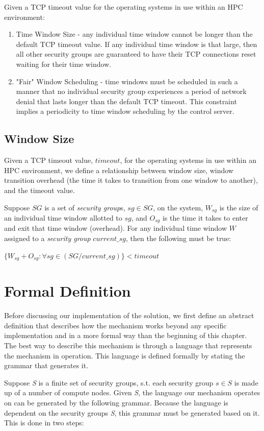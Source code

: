 \documentclass[oneside,12pt]{memoir}
\newcommand{\tab}{\hspace*{2em}}
\begin{document}
Given a TCP timeout value for the operating systems in use within an HPC environment:
\begin{enumerate} \itemsep1pt \parskip0pt 
\item Time Window Size - any individual time window cannot be longer than the default TCP timeout value. If any individual time window is that large, then all other security groups are guaranteed to have their TCP connections reset waiting for their time window.
\item "Fair" Window Scheduling - time windows must be scheduled in such a manner that no individual security group experiences a period of network denial that lasts longer than the default TCP timeout. This constraint implies a periodicity to time window scheduling by the control server.
\end{enumerate}

\subsection{Window Size}
Given a TCP timeout value, $timeout$, for the operating systems in use within an HPC environment, we define a relationship between window size, window transition overhead (the time it takes to transition from one window to another), and the timeout value.

Suppose $SG$ is a set of \textit{security group}s, $sg\in SG$, on the system, $W_{sg}$ is the size of an individual time window allotted to $sg$, and $O_{sg}$ is the time it takes to enter and exit that time window (overhead). For any individual time window $W$ assigned to a \textit{security group} $current\_sg$, then the following must be true:

\tab $\{W_{sg} + O_{sg}: \forall sg\in (SG / current\_sg)\} < timeout$


\section{Formal Definition}
\label{sec:formal_definition}
Before discussing our implementation of the solution, we first define an abstract definition that describes how the mechanism works beyond any specific implementation and in a more formal way than the beginning of this chapter. The best way to describe this mechanism is through a language that represents the mechanism in operation. This language is defined formally by stating the grammar that generates it.

Suppose \emph{S} is a finite set of security groups, s.t. each security group $s\in S$ is made up of a number of compute nodes. Given \emph{S}, the language our mechanism operates on can be generated by the following grammar. Because the language is dependent on the security groups \emph{S}, this grammar must be generated based on it. This is done in two steps:
\end{document}
